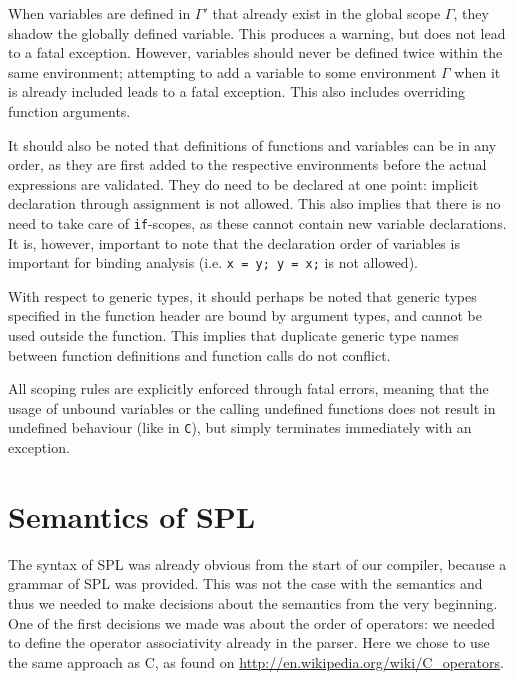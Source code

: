 \documentclass[a4paper]{article}
\begin{document}
When variables are defined in $\Gamma'$ that already exist in the global scope $\Gamma$, they shadow the globally defined variable. This produces a warning, but does not lead to a fatal exception. However, variables should never be defined twice within the same environment; attempting to add a variable to some environment $\Gamma$ when it is already included leads to a fatal exception. This also includes overriding function arguments.

It should also be noted that definitions of functions and variables can be in any order, as they are first added to the respective environments before the actual expressions are validated. They do need to be declared at one point: implicit declaration through assignment is not allowed. This also implies that there is no need to take care of {\tt if}-scopes, as these cannot contain new variable declarations. It is, however, important to note that the declaration order of variables is important for binding analysis (i.e. {\tt x = y; y = x;} is not allowed).

With respect to generic types, it should perhaps be noted that generic types specified in the function header are bound by argument types, and cannot be used outside the function. This implies that duplicate generic type names between function definitions and function calls do not conflict.

All scoping rules are explicitly enforced through fatal errors, meaning that the usage of unbound variables or the calling undefined functions does not result in undefined behaviour (like in {\tt C}), but simply terminates immediately with an exception.

\section{Semantics of SPL}
The syntax of SPL was already obvious from the start of our compiler, because a grammar of SPL was provided. This was not the case with the semantics and thus we needed to make decisions about the semantics from the very beginning. One of the first decisions we made was about the order of operators: we needed to define the operator associativity already in the parser. Here we chose to use the same approach as C, as found on \url{http://en.wikipedia.org/wiki/C\_operators}. 
\end{document}
